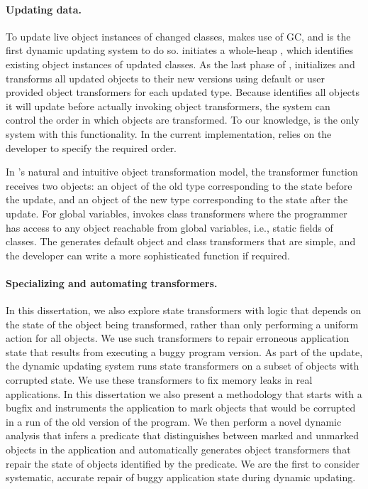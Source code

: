 \paragraph{Updating data.} To update live object instances of changed
  classes, \JV makes use of \acf{GC}, and is the first dynamic updating system to
  do so.  \JV initiates a whole-heap \GC, which identifies existing object instances
  of updated classes. As the last phase of \GC, \JV initializes and
  transforms all updated objects to their new versions using default or
  user provided object transformers for each updated type.
Because \JV identifies all objects it will update before actually
  invoking object transformers, the system can control the order in which
  objects are transformed. To our knowledge, \JV is the only system with
  this functionality. In the current implementation, \JV relies on the
  developer to specify the required order.

In \JV's natural and intuitive object transformation model, the
  transformer function receives two objects: an object of the old type
  corresponding to the state before the update, and an object of the new type
  corresponding to the state after the update.
For global variables,
\JV invokes class transformers where the
  programmer has access to any object reachable from global variables, i.e.,
  static fields of classes.  The \UPT generates default object and class
  transformers that are simple, and the developer can write a more
  sophisticated function if required.

\paragraph{Specializing and automating transformers.}
In this
  dissertation, we also explore state transformers with logic that depends
  on the state of the object being transformed, rather than only performing a
  uniform action for all objects. We use such transformers to repair
  erroneous application state that results from executing a buggy program
  version. As part of the update, the dynamic updating system runs state transformers
  on a subset of objects with corrupted state. We use these transformers to
  fix memory leaks in real applications. In this dissertation we also
  present a methodology that starts with a bugfix and instruments the
  application to mark objects that would be corrupted in a run of the old
  version of the program. We then perform a novel dynamic analysis that
  infers a predicate that distinguishes between marked and unmarked objects
  in the application and automatically generates object transformers that
  repair the state of objects identified by the predicate. We are the first
  to consider systematic, accurate repair of buggy application state during
  dynamic updating.

